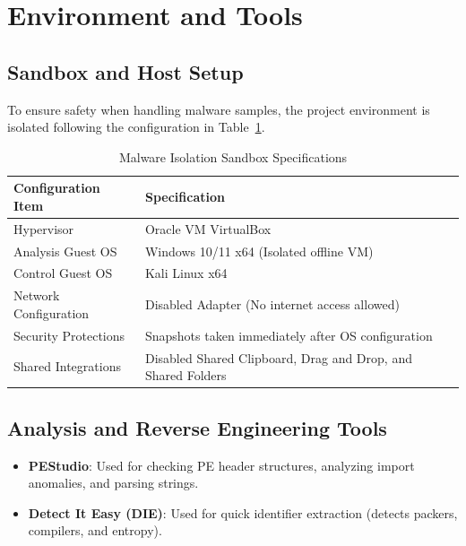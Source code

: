 \documentclass[11pt,a4paper]{article}
\begin{document}
\newpage

\section{Environment and Tools}

\subsection{Sandbox and Host Setup}
To ensure safety when handling malware samples, the project environment is isolated following the configuration in Table~\ref{tab:sandbox}.

\begin{table}[h]
\centering
\caption{Malware Isolation Sandbox Specifications}
\label{tab:sandbox}
\begin{tabular}{lp{10cm}}
\toprule
\textbf{Configuration Item} & \textbf{Specification} \\
\midrule
Hypervisor & Oracle VM VirtualBox \\
Analysis Guest OS & Windows 10/11 x64 (Isolated offline VM) \\
Control Guest OS & Kali Linux x64 \\
Network Configuration & Disabled Adapter (No internet access allowed) \\
Security Protections & Snapshots taken immediately after OS configuration \\
Shared Integrations & Disabled Shared Clipboard, Drag and Drop, and Shared Folders \\
\bottomrule
\end{tabular}
\end{table}

\subsection{Analysis and Reverse Engineering Tools}
\begin{itemize}
    \item \textbf{PEStudio}: Used for checking PE header structures, analyzing import anomalies, and parsing strings.
    \item \textbf{Detect It Easy (DIE)}: Used for quick identifier extraction (detects packers, compilers, and entropy).
\end{itemize}
\end{document}
